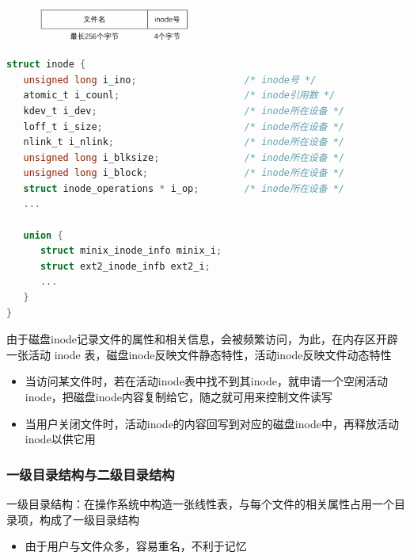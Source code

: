 \documentclass[cs4size,a4paper,10pt]{ctexart}
\begin{document}
	\begin{figure}[H]
		\centering
		\includegraphics[width=0.45\textwidth]{img/Linux系统的FCB}
	\end{figure}

	\begin{lstlisting}[language=C,keywordstyle=\color{black}]
struct inode {
   unsigned long i_ino;                   /* inode号 */
   atomic_t i_counl;                      /* inode引用数 */
   kdev_t i_dev;                          /* inode所在设备 */
   loff_t i_size;                         /* inode所在设备 */
   nlink_t i_nlink;                       /* inode所在设备 */
   unsigned long i_blksize;               /* inode所在设备 */
   unsigned long i_block;                 /* inode所在设备 */
   struct inode_operations * i_op;        /* inode所在设备 */
   ...

   union {
      struct minix_inode_info minix_i;
      struct ext2_inode_infb ext2_i;
      ...
   }
}
	\end{lstlisting}

	由于磁盘inode记录文件的属性和相关信息，会被频繁访问，为此，在内存区开辟一张活动 inode 表，磁盘inode反映文件静态特性，活动inode反映文件动态特性
	\begin{itemize}
		\item 当访问某文件时，若在活动inode表中找不到其inode，就申请一个空闲活动inode，把磁盘inode内容复制给它，随之就可用来控制文件读写
		\item 当用户关闭文件时，活动inode的内容回写到对应的磁盘inode中，再释放活动inode以供它用
	\end{itemize}
	
	\subsubsection{一级目录结构与二级目录结构}
	一级目录结构：在操作系统中构造一张线性表，与每个文件的相关属性占用一个目录项，构成了一级目录结构
	\begin{itemize}
		\item 由于用户与文件众多，容易重名，不利于记忆
	\end{itemize}
\end{document}
